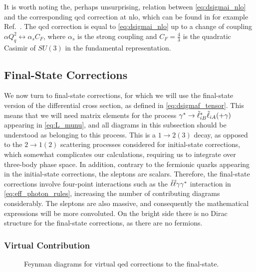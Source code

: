It is worth noting the, perhaps unsurprising, relation between \cref{eq:dsigmai_nlo} and the corresponding \gls{qcd} correction at \gls{nlo}, which can be found in for example Ref.~\cite{Tore:2022}.
The \gls{qcd} correction is equal to \cref{eq:dsigmai_nlo} up to a change of coupling $\alpha Q_q^2 \leftrightarrow \alpha_s C_F$, where $\alpha_s$ is the strong coupling and $C_F=\frac{4}{3}$ is the quadratic Casimir of $SU(3)$ in the fundamental representation.


\subsection{Final-State Corrections}\label{sec:final_state}

We now turn to final-state corrections, for which we will use the final-state version of the differential cross section, as defined in \cref{eq:dsigmaf_tensor}.
This means that we will need matrix elements for the process $\gamma^* \to {\tilde{\ell}}_{iB}^*{\tilde{\ell}}_{iA}(+\gamma)$ appearing in \cref{eq:L_munu}, and all diagrams in this subsection should be understood as belonging to this process.
This is a $1\to2(3)$ decay, as opposed to the $2\to1(2)$ scattering processes considered for initial-state corrections, which somewhat complicates our calculations, requiring us to integrate over three-body phase space.
In addition, contrary to the fermionic quarks appearing in the initial-state corrections, the sleptons are scalars.
Therefore, the final-state corrections involve four-point interactions such as the ${\tilde{\ell}}{\tilde{\ell}}\gamma\gamma^*$ interaction in \cref{eq:eff_photon_rules}, increasing the number of contributing diagrams considerably.
The sleptons are also massive, and consequently the mathematical expressions will be more convoluted.
On the bright side there is no Dirac structure for the final-state corrections, as there are no fermions.

\subsubsection{Virtual Contribution}

\begin{figure}
    \centering
    \begin{subfigure}[b]{0.32\linewidth}
        \centering
    \end{subfigure}
    \begin{subfigure}[b]{0.32\linewidth}
        \centering
    \end{subfigure}
    \begin{subfigure}[b]{0.32\linewidth}
        \centering
    \end{subfigure}
    \caption{Feynman diagrams for virtual \acrshort{qed} corrections to the final-state.}
    \label{fig:fs_virt}
\end{figure}

